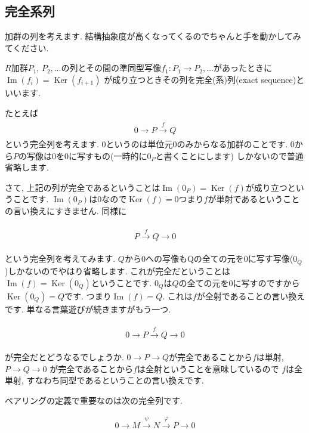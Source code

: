 \documentclass{jsarticle}
\newcommand{\makeop}[1]{\mathop{\mathrm{#1}}\nolimits}
\def\Im{\makeop{Im}}
\def\Ker{\makeop{Ker}}
\theoremstyle{definition}
\numberwithin{theorem}{section}
\begin{document}
\subsection{完全系列}
加群の列を考えます. 結構抽象度が高くなってくるのでちゃんと手を動かしてみてください.

$R$加群$P_1$, $P_2, \ldots$の列とその間の準同型写像$f_1: P_1 \rightarrow P_2, \ldots$があったときに$\Im(f_i) = \Ker(f_{i+1})$
が成り立つときその列を完全(系)列(exact sequence)といいます.

たとえば
\begin{eqnarray*}
\begin{aligned}
0 \rightarrow P \xrightarrow{f} Q
\end{aligned}
\end{eqnarray*}
という完全列を考えます. $0$というのは単位元$0$のみからなる加群のことです. $0$から$P$の写像は$0$を$0$に写すもの(一時的に$0_P$と書くことにします)
しかないので普通省略します.

さて, 上記の列が完全であるということは$\Im(0_P) = \Ker(f)$が成り立つということです. $\Im(0_P)$は$0$なので$\Ker(f) = 0$つまり$f$が単射であるということの言い換えにすきません.
同様に

\begin{eqnarray*}
\begin{aligned}
P \xrightarrow{f} Q \rightarrow 0
\end{aligned}
\end{eqnarray*}

という完全列を考えてみます. $Q$から$0$への写像もQの全ての元を$0$に写す写像($0_Q$)しかないのでやはり省略します. これが完全だということは
$\Im(f) = \Ker(0_Q)$ということです. $0_Q$は$Q$の全ての元を$0$に写すのですから$\Ker(0_Q) = Q$です. つまり$\Im(f) = Q$.
これは$f$が全射であることの言い換えです. 単なる言葉遊びが続きますがもう一つ.

\begin{eqnarray*}
\begin{aligned}
0 \rightarrow P \xrightarrow{f} Q \rightarrow 0
\end{aligned}
\end{eqnarray*}

が完全だとどうなるでしょうか. $0 \rightarrow P \rightarrow Q$が完全であることから$f$は単射, $P\rightarrow Q \rightarrow 0$
が完全であることから$f$は全射ということを意味しているので $f$は全単射, すなわち同型であるということの言い換えです.

ペアリングの定義で重要なのは次の完全列です.

\begin{equation}
\label{eq:pairing_exact_seq}
\begin{aligned}
0 \rightarrow M \xrightarrow{\displaystyle\psi} N \xrightarrow{\displaystyle\varphi} P\rightarrow 0
\end{aligned}
\end{equation}
\end{document}
